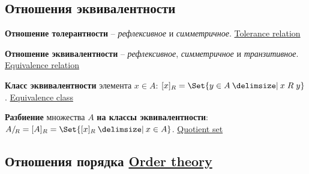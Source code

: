 \documentclass[a4paper,10pt]{article}
\begin{document}
\subsection{Отношения эквивалентности}

\begin{terms}
    \item \textbf{Отношение толерантности} -- \textit{рефлексивное} и \textit{симметричное}.
    \hfill\href{https://en.wikipedia.org/wiki/Tolerance_relation}{Tolerance relation}

    \item \textbf{Отношение эквивалентности} -- \textit{рефлексивное}, \textit{симметричное} и \textit{транзитивное}.
    \hfill\href{https://en.wikipedia.org/wiki/Equivalence_relation}{Equivalence relation}

    \item \textbf{Класс эквивалентности} элемента $x \in A$: $\equivclass{x} = \Set{y \in A \given x \rel y}$.
    \hfill\href{https://en.wikipedia.org/wiki/Equivalence_class}{Equivalence class}

    \item \textbf{Разбиение} множества $A$ \textbf{на классы эквивалентности}: $\quotient[R]{A} = \equivclass{A} = \Set{\equivclass{x} \given x \in A}$.
    \hfill\href{https://en.wikipedia.org/wiki/Quotient_set}{Quotient set}
\end{terms}


\subsection{Отношения порядка%
\texorpdfstring{\hfill\normalfont\href{https://en.wikipedia.org/wiki/Order_theory}{Order theory}}{}}
\end{document}
